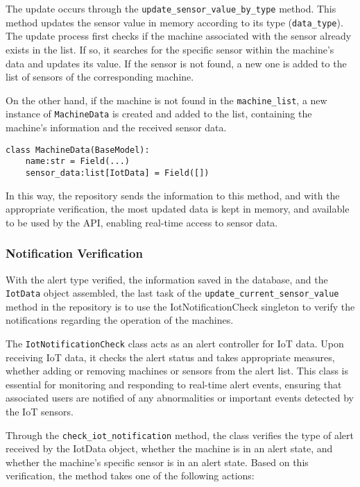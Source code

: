The update occurs through the \texttt{update\_sensor\_value\_by\_type} method. This method updates the sensor value in memory according to its type (\texttt{data\_type}). The update process first checks if the machine associated with the sensor already exists in the list. If so, it searches for the specific sensor within the machine's data and updates its value. If the sensor is not found, a new one is added to the list of sensors of the corresponding machine.

On the other hand, if the machine is not found in the \texttt{machine\_list}, a new instance of \texttt{MachineData} is created and added to the list, containing the machine's information and the received sensor data.

\begin{Verbatim}[fontsize=\small, baselinestretch=0.8]
class MachineData(BaseModel):
    name:str = Field(...)
    sensor_data:list[IotData] = Field([])
\end{Verbatim}

In this way, the repository sends the information to this method, and with the appropriate verification, the most updated data is kept in memory, and available to be used by the \gls{API}, enabling real-time access to sensor data.

\subsubsection{Notification Verification}
With the alert type verified, the information saved in the database, and the \texttt{IotData} object assembled, the last task of the \texttt{update\_current\_sensor\_value} method in the repository is to use the IotNotificationCheck singleton to verify the notifications regarding the operation of the machines.

The \texttt{IotNotificationCheck} class acts as an alert controller for IoT data. Upon receiving IoT data, it checks the alert status and takes appropriate measures, whether adding or removing machines or sensors from the alert list. This class is essential for monitoring and responding to real-time alert events, ensuring that associated users are notified of any abnormalities or important events detected by the IoT sensors.

Through the \texttt{check\_iot\_notification} method, the class verifies the type of alert received by the IotData object, whether the machine is in an alert state, and whether the machine's specific sensor is in an alert state. Based on this verification, the method takes one of the following actions:

